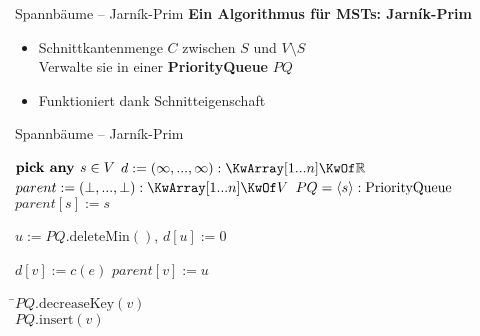 \begin{frame}{Spannbäume – Jarník-Prim}
	\textbf{Ein Algorithmus für MSTs: Jarník-Prim} 
	\begin{itemize}
		\implitem \textbf{Idee}: Schnitteigenschaft irgendwie ausnutzen! \\
		. Starte ab beliebigem $s \in V$, setze $S := \{s\}$ \\
		2. \textbf{Erweitere} Knotenmenge $S$ und Baum $T$ \textbf{schrittweise} um die \textbf{minimale} Verbindungskante zu $\ V \setminus S$
		\pause
		\item Schnittkantenmenge $C$ zwischen $S$ und $V \setminus S$ \\
		\impl Verwalte sie in einer \textbf{PriorityQueue} $PQ$
		\pause
		\item[\yop] Funktioniert dank Schnitteigenschaft
	\end{itemize}
\end{frame}

\begin{frame}{Spannbäume – Jarník-Prim}
	\vspace{-.4\baselineskip}
	\begin{exampleblock}{}
		\vspace{-.4\baselineskip}
		\begin{algorithm}[H]
			\small							
			 {
				$\KwSty{pick any } s \in V$\;
				$d := (\infty, ..., \infty) : \KwArray[1...n] \KwOf \R$   \;
				$parent := (\bot, ..., \bot) : \KwArray[1...n] \KwOf V$\;
				$PQ = \langle s \rangle : \text{PriorityQueue}$\;
				$parent[s] := s$ \;
				 {
					$u := PQ.\text{deleteMin}()$, \quad \alert{$d[u] := 0$} \;
					 {
						 {
							\alert{$d[v] := c(e)$} \;
							$parent[v] := u$\;
							\begin{tabbing}
								 {
									\=$PQ.\text{decreaseKey}(v)$ \\
								} {
									\>$PQ.\text{insert}(v)$
								} 
							\end{tabbing}
							\vspace{-\baselineskip}
						}
					}
				}
			\;
			}
		\end{algorithm} \vspace{-.4\baselineskip}
	\end{exampleblock}
\end{frame}

